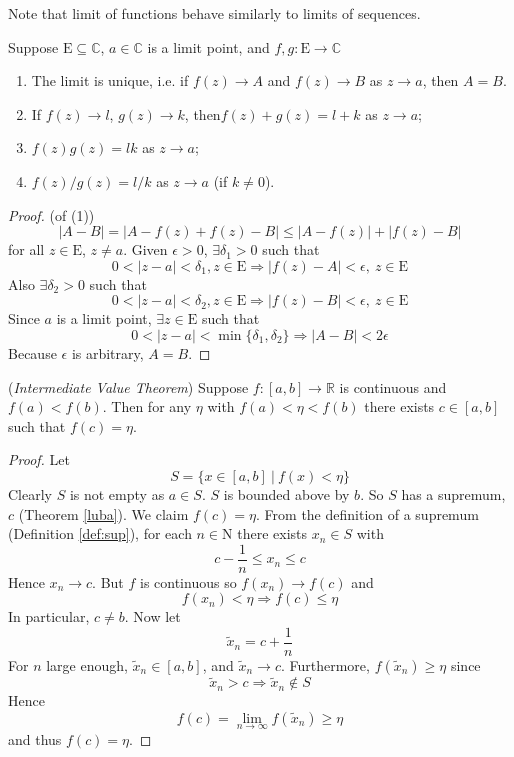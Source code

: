 \documentclass[10pt, a4paper, twoside]{report}
\begin{document}
Note that limit of functions behave similarly to limits of sequences.
\begin{lemma}
    Suppose \(\mathrm{E}\subseteq\mathbb{C}\), \(a\in\mathbb{C}\) is a limit point, and \(f,g:\mathrm{E}\to\mathbb{C}\)
    \begin{enumerate}
        \item The limit is unique, i.e. if \(f(z)\to A\) and \(f(z)\to B\) as \(z\to a\), then \(A=B\).
        \item If \(f(z)\to l\), \(g(z)\to k\), then\(f(z)+g(z)=l+k\) \space as \(z\to a\);
        \item \(f(z)g(z)=lk\) \space as \(z\to a\);
        \item \(f(z)/g(z)=l/k\) \space as \(z\to a\) (if \(k\neq 0\)).
    \end{enumerate}
    \label{lemma:fund_limit}
\end{lemma}
\begin{proof}
    (of (1))
    \[|A-B|=|A-f(z)+f(z)-B|\leq|A-f(z)|+|f(z)-B|\]
    for all \(z\in\mathrm{E}\), \(z\neq a\). Given \(\epsilon>0\), \(\exists\delta_1>0\) such that
    \[0<|z-a|<\delta_1,z\in\mathrm{E}\Rightarrow |f(z)-A|<\epsilon,\:z\in\mathrm{E}\]
    Also \(\exists\delta_2>0\) such that 
    \[0<|z-a|<\delta_2,z\in\mathrm{E}\Rightarrow |f(z)-B|<\epsilon,\:z\in\mathrm{E}\]
    Since \(a\) is a limit point, \(\exists z\in\mathrm{E}\) such that 
    \[0<|z-a|<\min\{\delta_1,\delta_2\}\Rightarrow|A-B|<2\epsilon\]
    Because \(\epsilon\) is arbitrary, \(A=B\).
\end{proof}
\begin{theorem}
    (\emph{Intermediate Value Theorem}) Suppose \(f:[a,b]\to\mathbb{R}\) is continuous and \(f(a)<f(b)\). Then for any \(\eta\) with \(f(a)<\eta<f(b)\) there exists \(c\in[a,b]\) such that \(f(c)=\eta\).
    \label{thm:ivt}
\end{theorem}
\begin{proof}
    Let 
    \[S=\{x\in[a,b]\:|\:f(x)<\eta\}\]
    Clearly \(S\) is not empty as \(a\in S\). \(S\) is bounded above by \(b\). So \(S\) has a supremum, \(c\) (Theorem \ref{luba}). We claim \(f(c)=\eta\). From the definition of a supremum (Definition \ref{def:sup}), for each \(n\in\mathrm{N}\) there exists \(x_n\in S\) with 
    \[c-\frac 1n\leq x_n\leq c\]
    Hence \(x_n\to c\). But \(f\) is continuous so \(f(x_n)\to f(c)\) and 
    \[f(x_n)<\eta\Rightarrow f(c)\leq\eta\]
    In particular, \(c\neq b\). Now let
    \[\tilde{x}_n=c+\frac 1n\]
    For \(n\) large enough, \(\tilde{x}_n\in[a,b]\), and \(\tilde{x}_n\to c\). Furthermore, \(f(\tilde{x}_n)\geq\eta\) since \[\tilde{x}_n>c\Rightarrow\tilde{x}_n\notin S\]
    Hence 
    \[f(c)=\lim_{n\to\infty}f(\tilde{x}_n)\geq\eta\]
    and thus \(f(c)=\eta\).
\end{proof}
\end{document}
